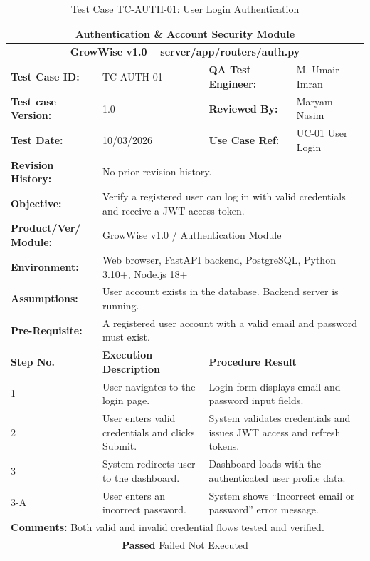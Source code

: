 \documentclass{FastFyp}
\begin{document}
\begin{table}[H]
\footnotesize
\centering
\caption{Test Case TC-AUTH-01: User Login Authentication}
\label{tab:tcauth}
\begin{tabular}{|p{2.5cm}|p{4cm}|p{2.5cm}|p{4.5cm}|}
\hline
\multicolumn{4}{|c|}{\textbf{Authentication \& Account Security Module}} \\ \hline
\multicolumn{4}{|c|}{\textbf{GrowWise v1.0 -- server/app/routers/auth.py}} \\ \hline
\textbf{Test Case ID:} & TC-AUTH-01 & \textbf{QA Test Engineer:} & M. Umair Imran \\ \hline
\textbf{Test case Version:} & 1.0 & \textbf{Reviewed By:} & Maryam Nasim \\ \hline
\textbf{Test Date:} & 10/03/2026 & \textbf{Use Case Ref:} & UC-01 User Login \\ \hline
\textbf{Revision History:} & \multicolumn{3}{p{11cm}|}{No prior revision history.} \\ \hline
\textbf{Objective:} & \multicolumn{3}{p{11cm}|}{Verify a registered user can log in with valid credentials and receive a JWT access token.} \\ \hline
\textbf{Product/Ver/ Module:} & \multicolumn{3}{p{11cm}|}{GrowWise v1.0 / Authentication Module} \\ \hline
\textbf{Environment:} & \multicolumn{3}{p{11cm}|}{Web browser, FastAPI backend, PostgreSQL, Python 3.10+, Node.js 18+} \\ \hline
\textbf{Assumptions:} & \multicolumn{3}{p{11cm}|}{User account exists in the database. Backend server is running.} \\ \hline
\textbf{Pre-Requisite:} & \multicolumn{3}{p{11cm}|}{A registered user account with a valid email and password must exist.} \\ \hline
\textbf{Step No.} & \textbf{Execution Description} & \multicolumn{2}{p{7cm}|}{\textbf{Procedure Result}} \\ \hline
1 & User navigates to the login page. & \multicolumn{2}{p{7cm}|}{Login form displays email and password input fields.} \\ \hline
2 & User enters valid credentials and clicks Submit. & \multicolumn{2}{p{7cm}|}{System validates credentials and issues JWT access and refresh tokens.} \\ \hline
3 & System redirects user to the dashboard. & \multicolumn{2}{p{7cm}|}{Dashboard loads with the authenticated user profile data.} \\ \hline
3-A & User enters an incorrect password. & \multicolumn{2}{p{7cm}|}{System shows ``Incorrect email or password'' error message.} \\ \hline
\multicolumn{4}{|p{13.5cm}|}{\textbf{Comments:} Both valid and invalid credential flows tested and verified.} \\ \hline
\multicolumn{4}{|c|}{\underline{\textbf{Passed}} \quad\quad\quad Failed \quad\quad\quad Not Executed} \\ \hline
\end{tabular}
\end{table}
\end{document}
